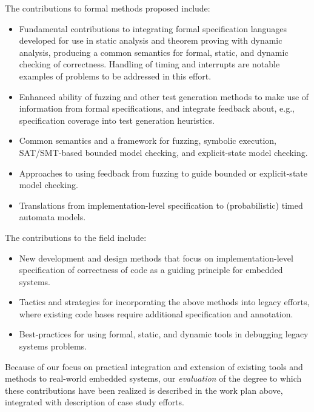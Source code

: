 The contributions to formal methods proposed include:

\begin{itemize}
\item Fundamental contributions to integrating formal specification
languages developed for use in static analysis and theorem proving
with dynamic analysis, producing a common semantics for formal,
static, and dynamic checking of correctness.  Handling of timing and
interrupts are notable examples of problems to be addressed in this effort.
\item Enhanced ability of fuzzing and other test generation methods to
make use of information from formal specifications, and integrate
feedback about, e.g., specification coverage into test generation
heuristics.
\item Common semantics and a framework for fuzzing, symbolic execution, SAT/SMT-based
bounded model checking, and explicit-state model checking.
\item Approaches to using feedback from fuzzing to guide bounded or explicit-state model
checking.
\item Translations from implementation-level specification to
(probabilistic) timed automata models.
\end{itemize}

The contributions to the field include:

\begin{itemize}
\item New development and design methods that focus on
implementation-level specification of correctness of code as a guiding
principle for embedded systems.
\item Tactics and strategies for incorporating the above methods into
legacy efforts, where existing code bases require additional
specification and annotation.
\item Best-practices for using formal, static, and dynamic tools in
debugging legacy systems problems.
\end{itemize}


Because of our focus on practical integration and extension of
existing tools and methods to real-world embedded systems,
our \emph{evaluation} of the degree to which these contributions have
been realized is described in the work plan above, integrated with
description of case study efforts.